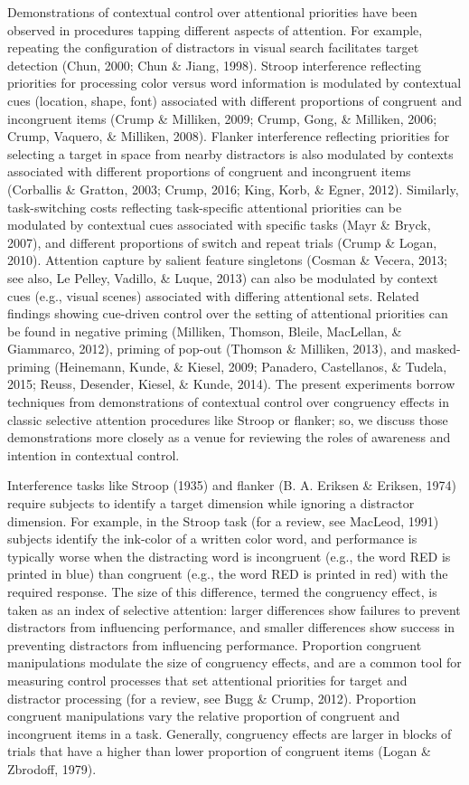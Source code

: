 \documentclass[english,,man,floatsintext]{apa6}
\begin{document}
Demonstrations of contextual control over attentional priorities have
been observed in procedures tapping different aspects of attention. For
example, repeating the configuration of distractors in visual search
facilitates target detection (Chun, 2000; Chun \& Jiang, 1998). Stroop
interference reflecting priorities for processing color versus word
information is modulated by contextual cues (location, shape, font)
associated with different proportions of congruent and incongruent items
(Crump \& Milliken, 2009; Crump, Gong, \& Milliken, 2006; Crump,
Vaquero, \& Milliken, 2008). Flanker interference reflecting priorities
for selecting a target in space from nearby distractors is also
modulated by contexts associated with different proportions of congruent
and incongruent items (Corballis \& Gratton, 2003; Crump, 2016; King,
Korb, \& Egner, 2012). Similarly, task-switching costs reflecting
task-specific attentional priorities can be modulated by contextual cues
associated with specific tasks (Mayr \& Bryck, 2007), and different
proportions of switch and repeat trials (Crump \& Logan, 2010).
Attention capture by salient feature singletons (Cosman \& Vecera, 2013;
see also, Le Pelley, Vadillo, \& Luque, 2013) can also be modulated by
context cues (e.g., visual scenes) associated with differing attentional
sets. Related findings showing cue-driven control over the setting of
attentional priorities can be found in negative priming (Milliken,
Thomson, Bleile, MacLellan, \& Giammarco, 2012), priming of pop-out
(Thomson \& Milliken, 2013), and masked-priming (Heinemann, Kunde, \&
Kiesel, 2009; Panadero, Castellanos, \& Tudela, 2015; Reuss, Desender,
Kiesel, \& Kunde, 2014). The present experiments borrow techniques from
demonstrations of contextual control over congruency effects in classic
selective attention procedures like Stroop or flanker; so, we discuss
those demonstrations more closely as a venue for reviewing the roles of
awareness and intention in contextual control.

Interference tasks like Stroop (1935) and flanker (B. A. Eriksen \&
Eriksen, 1974) require subjects to identify a target dimension while
ignoring a distractor dimension. For example, in the Stroop task (for a
review, see MacLeod, 1991) subjects identify the ink-color of a written
color word, and performance is typically worse when the distracting word
is incongruent (e.g., the word RED is printed in blue) than congruent
(e.g., the word RED is printed in red) with the required response. The
size of this difference, termed the congruency effect, is taken as an
index of selective attention: larger differences show failures to
prevent distractors from influencing performance, and smaller
differences show success in preventing distractors from influencing
performance. Proportion congruent manipulations modulate the size of
congruency effects, and are a common tool for measuring control
processes that set attentional priorities for target and distractor
processing (for a review, see Bugg \& Crump, 2012). Proportion congruent
manipulations vary the relative proportion of congruent and incongruent
items in a task. Generally, congruency effects are larger in blocks of
trials that have a higher than lower proportion of congruent items
(Logan \& Zbrodoff, 1979).
\end{document}
